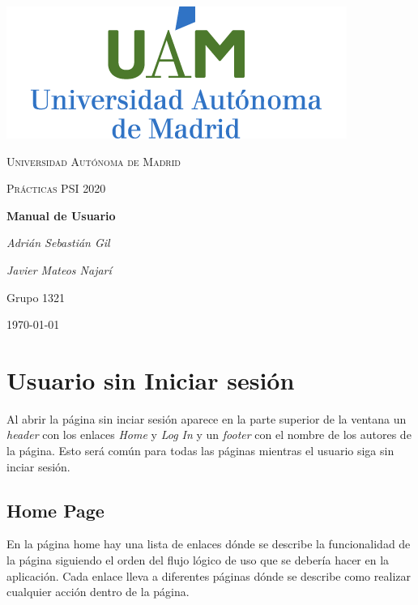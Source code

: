 \documentclass{article}
\begin{document}
    
\begin{titlepage}
    \begin{center}
        \includegraphics{img/Logo UAM.png}\par\vspace{1cm}\par\vspace{1cm}
        {\scshape\LARGE Universidad Autónoma de Madrid \par}
        \vspace{1cm}
        {\scshape\Large Prácticas PSI 2020\par}
        \vspace{1.5cm}
        {\huge\bfseries Manual de Usuario\par}
        \vspace{4cm}
        {\Large\itshape Adrián Sebastián Gil\par}
        {\Large\itshape Javier Mateos Najarí\par}
        \vspace{2cm}
        {\large Grupo 1321\par}
        \large\today
    \end{center}
\end{titlepage} 

\section*{Usuario sin Iniciar sesión}

Al abrir la página sin inciar sesión aparece en la parte superior de la ventana un
\textit{header} con los enlaces \textit{Home} y \textit{Log In} y un 
\textit{footer} con el nombre de los autores de la página. Esto será común para todas
las páginas mientras el usuario siga sin inciar sesión.

\subsection*{Home Page}

En la página home hay una lista de enlaces dónde se describe la funcionalidad
de la página siguiendo el orden del flujo lógico de uso que se debería hacer en la
aplicación. Cada enlace lleva a diferentes páginas dónde se describe como realizar 
cualquier acción dentro de la página.
\end{document}
